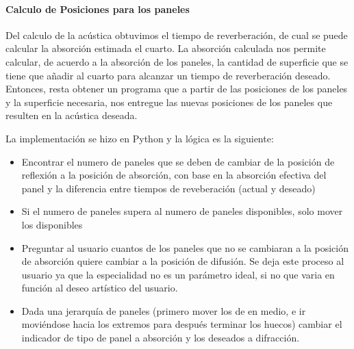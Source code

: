 \paragraph{Calculo de Posiciones para los paneles}

Del calculo de la acústica obtuvimos el tiempo de reverberación, de cual se puede calcular la absorción estimada el cuarto. La absorción calculada nos permite calcular, de acuerdo a la absorción de los paneles, la cantidad de superficie que se tiene que añadir al cuarto para alcanzar un tiempo de reverberación deseado. \\
Entonces, resta obtener un programa que a partir de las posiciones de los paneles y la superficie necesaria, nos entregue las nuevas posiciones de los paneles que resulten en la acústica deseada. 

La implementación se hizo en Python y la lógica es la siguiente:
\begin{itemize}
    \item Encontrar el numero de paneles que se deben de cambiar de la posición de reflexión a la posición de absorción, con base en la absorción efectiva del panel y la diferencia entre tiempos de reveberación (actual y deseado)
    \item Si el numero de paneles supera al numero de paneles disponibles, solo mover los disponibles
    \item Preguntar al usuario cuantos de los paneles que no se cambiaran a la posición de absorción quiere cambiar a la posición de difusión. Se deja este proceso al usuario ya que la especialidad no es un parámetro ideal, si no que varia en función al deseo artístico del usuario.
    \item Dada una jerarquía de paneles (primero mover los de en medio, e ir moviéndose hacia los extremos para después terminar los huecos) cambiar el indicador de tipo de panel a absorción y los deseados a difracción.
\end{itemize}

